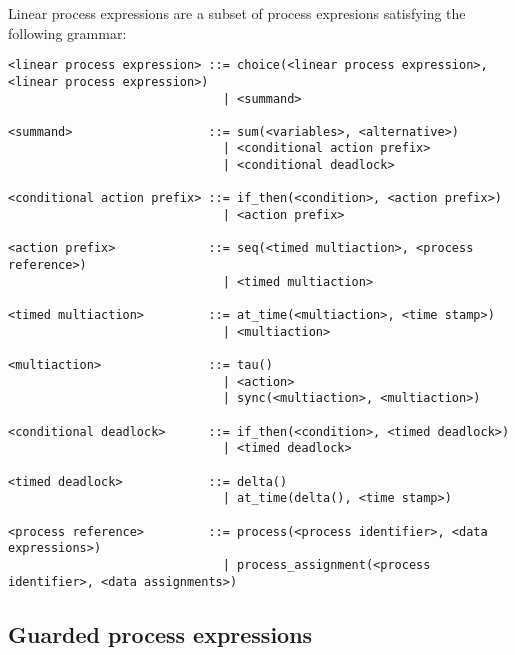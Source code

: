\documentclass{article}
\begin{document}
Linear process expressions are a subset of process expresions satisfying the
following grammar:
\begin{verbatim}
<linear process expression> ::= choice(<linear process expression>, <linear process expression>)
                              | <summand>

<summand>                   ::= sum(<variables>, <alternative>)
                              | <conditional action prefix>
                              | <conditional deadlock>

<conditional action prefix> ::= if_then(<condition>, <action prefix>)
                              | <action prefix>

<action prefix>             ::= seq(<timed multiaction>, <process reference>)
                              | <timed multiaction>

<timed multiaction>         ::= at_time(<multiaction>, <time stamp>)
                              | <multiaction>

<multiaction>               ::= tau()
                              | <action>
                              | sync(<multiaction>, <multiaction>)

<conditional deadlock>      ::= if_then(<condition>, <timed deadlock>)
                              | <timed deadlock>

<timed deadlock>            ::= delta()
                              | at_time(delta(), <time stamp>)

<process reference>         ::= process(<process identifier>, <data expressions>)
                              | process_assignment(<process identifier>, <data assignments>)
\end{verbatim}

\newpage

\subsection{Guarded process expressions}
\end{document}
